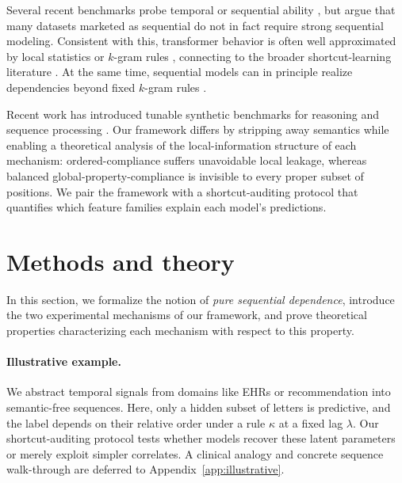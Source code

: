 \documentclass{article}
\theoremstyle{plain}
\theoremstyle{definition}
\theoremstyle{remark}
\begin{document}
Several recent benchmarks probe temporal or sequential ability \citep{fatemiTESTTIMEBENCHMARK2025,cui2025timertemporalinstructionmodeling}, but \citet{klenitskiyDoesItLook2024} argue that many datasets marketed as sequential do not in fact require strong sequential modeling. Consistent with this, transformer behavior is often well approximated by local statistics or $k$-gram rules \citep{nguyen2024understanding,kimLostSequenceLarge2025b,bediFidelityMedicalReasoning2025}, connecting to the broader shortcut-learning literature \citep{mccoy2019right,geirhos2020shortcut,mirzadeh2024gsm}. At the same time, sequential models can in principle realize dependencies beyond fixed \(k\)-gram rules \citep{olsson2022induction,guMambaLinearTimeSequence2024}.

Recent work has introduced tunable synthetic benchmarks for reasoning and sequence processing \citep{kaiserCogniLoadSyntheticNatural2025,ramezanaliSeqBenchTunableBenchmark2025}. Our framework differs by stripping away semantics while enabling a theoretical analysis of the local-information structure of each mechanism: ordered-compliance suffers unavoidable local leakage, whereas balanced global-property-compliance is invisible to every proper subset of positions. We pair the framework with a shortcut-auditing protocol that quantifies which feature families explain each model's predictions.

\section{Methods and theory}
\label{sec:formulation}
In this section, we formalize the notion of \textit{pure sequential dependence}, introduce the two experimental mechanisms of our framework, and prove theoretical properties characterizing each mechanism with respect to this property.

\paragraph{Illustrative example.}
We abstract temporal signals from domains like EHRs or recommendation into semantic-free sequences. Here, only a hidden subset of letters is predictive, and the label depends on their relative order under a rule $\kappa$ at a fixed lag $\lambda$. Our shortcut-auditing protocol tests whether models recover these latent parameters or merely exploit simpler correlates. A clinical analogy and concrete sequence walk-through are deferred to Appendix~\ref{app:illustrative}.
\end{document}
